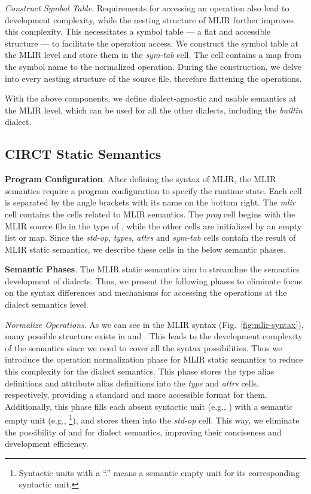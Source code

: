 \smallskip
\textit{Construct Symbol Table}. Requirements for accessing an operation also lead to development complexity, while the nesting structure of MLIR further improves this complexity. This necessitates a symbol table --- a flat and accessible structure --- to facilitate the operation access. We construct the symbol table at the MLIR level and store them in the \textit{sym-tab} cell. The cell contains a map from the symbol name to the normalized operation. During the construction, we delve into every nesting structure of the source file, therefore flattening the operations.

 With the above components, we define dialect-agnostic and usable semantics at the MLIR level, which can be used for all the other dialects, including the \textit{builtin} dialect.

\subsection{CIRCT Static Semantics}\label{sec:circt-static-semantics}


\smallskip
\textbf{Program Configuration}. After defining the syntax of MLIR, the MLIR semantics require a program configuration to specify the runtime state. Each cell is separated by the angle brackets with its name on the bottom right. The \textit{mlir} cell contains the cells related to MLIR semantics. The \textit{prog} cell begins with the MLIR source file in the type of , while the other cells are initialized by an empty list or map. Since the \textit{std-op}, \textit{types}, \textit{attrs} and \textit{sym-tab} cells contain the result of MLIR static semantics, we describe these cells in the below semantic phases.

\smallskip
\textbf{Semantic Phases}. The MLIR static semantics aim to streamline the semantics development of dialects. Thus, we present the following phases to eliminate focus on the syntax differences and mechanisms for accessing the operations at the dialect semantics level.

\smallskip
\textit{Normalize Operations}. As we can see in the MLIR syntax (Fig.~\ref{fig:mlir-syntax}), many possible structure exists in  and . This leads to the development complexity of the semantics since we need to cover all the syntax possibilities. Thus we introduce the operation normalization phase for MLIR static semantics to reduce this complexity for the dialect semantics. This phase stores the type alias definitions  and attribute alias definitions  into the \textit{type} and \textit{attrs} cells, respectively, providing a standard and more accessible format for them. Additionally, this phase fills each absent syntactic unit (e.g., \scmd{(}\tok{=}) with a semantic empty unit (e.g., \footnote{Syntactic units with a ``.'' means a semantic empty unit for its corresponding syntactic unit.}), and stores them into the \textit{std-op} cell.  This way, we eliminate the possibility of  and  for dialect semantics, improving their conciseness and development efficiency.

